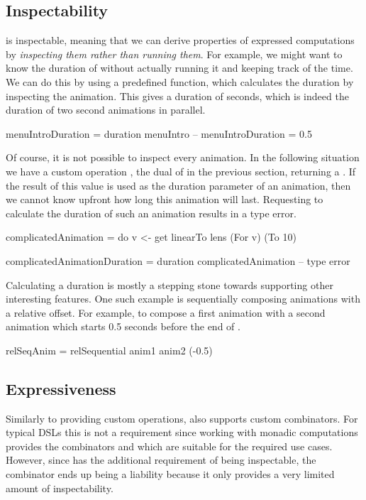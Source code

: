 \subsection{Inspectability}

\dsl{} is inspectable, meaning that we can derive properties of expressed computations by \emph{inspecting them rather than running them}. For example, we might want to know the duration of  without actually running it and keeping track of the time. We can do this by using a predefined  function, which calculates the duration by inspecting the animation. This gives a duration of  seconds, which is indeed the duration of two  second animations in parallel.

\begin{spec}
menuIntroDuration = duration menuIntro
-- menuIntroDuration = 0.5 
\end{spec}

Of course, it is not possible to inspect every animation. In the following situation we have a custom operation , the dual of  in the previous section, returning a . If the result of this value is used as the duration parameter of an animation, then we cannot know upfront how long this animation will last. Requesting to calculate the duration of such an animation results in a type error.

\begin{spec}
complicatedAnimation = do
  v <- get
  linearTo lens (For v) (To 10)

complicatedAnimationDuration = duration complicatedAnimation
-- type error
\end{spec}

Calculating a duration is mostly a stepping stone towards supporting other interesting features. One such example is sequentially composing animations with a relative offset. For example, to compose a first animation  with a second animation  which starts 0.5 seconds before the end of .

\begin{spec}
relSeqAnim = relSequential anim1 anim2 (-0.5)
\end{spec}

\subsection{Expressiveness}
\label{sec:customcomb}

Similarly to providing custom operations, \dsl{} also supports custom combinators. For typical DSLs this is not a requirement since working with monadic computations provides the combinators \hs{>>=} and  which are suitable for the required use cases. However, since \dsl{} has the additional requirement of being inspectable, the \hs{>>=} combinator ends up being a liability because it only provides a very limited amount of inspectability.

